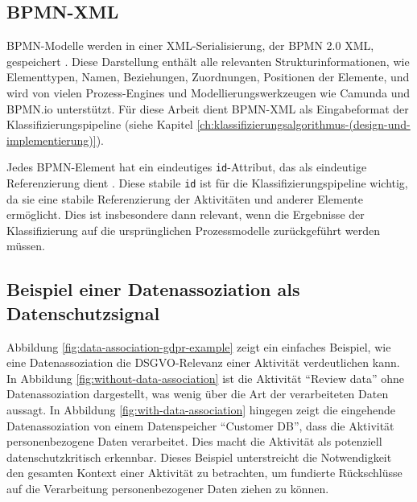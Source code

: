 \subsection*{\ac{BPMN}-XML}

\ac{BPMN}-Modelle werden in einer XML-Serialisierung, der \ac{BPMN} 2.0 XML, gespeichert \cite{omgbpmn}. Diese Darstellung enthält alle relevanten Strukturinformationen, wie Elementtypen, Namen, Beziehungen, Zuordnungen, Positionen der Elemente, und wird von vielen Prozess-Engines und Modellierungswerkzeugen wie Camunda \cite{camunda} und BPMN.io \cite{bpmnio} unterstützt. Für diese Arbeit dient \ac{BPMN}-XML als Eingabeformat der Klassifizierungspipeline (siehe Kapitel \ref{ch:klassifizierungsalgorithmus-(design-und-implementierung)}).

Jedes \ac{BPMN}-Element hat ein eindeutiges \texttt{id}-Attribut, das als eindeutige Referenzierung dient \cite{omgbpmn}. Diese stabile \texttt{id} ist für die Klassifizierungspipeline wichtig, da sie eine stabile Referenzierung der Aktivitäten und anderer Elemente ermöglicht. Dies ist insbesondere dann relevant, wenn die Ergebnisse der Klassifizierung auf die ursprünglichen Prozessmodelle zurückgeführt werden müssen.

\subsection*{Beispiel einer Datenassoziation als Datenschutzsignal}

Abbildung \ref{fig:data-association-gdpr-example} zeigt ein einfaches Beispiel, wie eine Datenassoziation die \ac{DSGVO}-Relevanz einer Aktivität verdeutlichen kann. In Abbildung \ref{fig:without-data-association} ist die Aktivität \enquote{Review data} ohne Datenassoziation dargestellt, was wenig über die Art der verarbeiteten Daten aussagt. In Abbildung \ref{fig:with-data-association} hingegen zeigt die eingehende Datenassoziation von einem Datenspeicher \enquote{Customer DB}, dass die Aktivität personenbezogene Daten verarbeitet. Dies macht die Aktivität als potenziell datenschutzkritisch erkennbar. Dieses Beispiel unterstreicht die Notwendigkeit den gesamten Kontext einer Aktivität zu betrachten, um fundierte Rückschlüsse auf die Verarbeitung personenbezogener Daten ziehen zu können.

